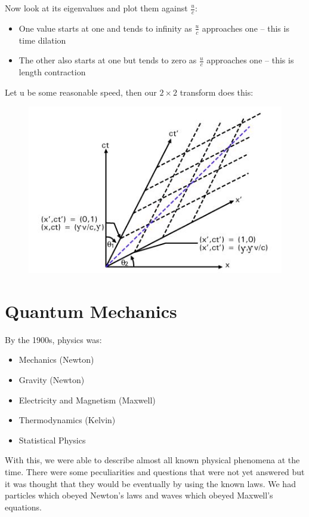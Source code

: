 \documentclass[a4paper, 11pt, normalem]{report}
\begin{document}
Now look at its eigenvalues and plot them against $\frac{u}{c}$: 
\begin{itemize}
    \item One value starts at one and tends to infinity as $\frac{u}{c}$ approaches one -- this is time dilation 
    \item The other also starts at one but tends to zero as $\frac{u}{c}$ approaches one -- this is length contraction 
\end{itemize}
Let u be some reasonable speed, then our $2\times2$ transform does this:
\begin{figure}[H]
    \centering
    \includegraphics{Lorentz.jpg}
\end{figure}

\chapter{Quantum Mechanics}
By the 1900s, physics was:
\begin{itemize}
    \item Mechanics (Newton)
    \item Gravity (Newton)
    \item Electricity and Magnetism (Maxwell)
    \item Thermodynamics (Kelvin)
    \item Statistical Physics
\end{itemize}
With this, we were able to describe almost all known physical phenomena at the time.
There were some peculiarities and questions that were not yet answered but it was thought that they would be eventually by using the known laws.
We had particles which obeyed Newton's laws and waves which obeyed Maxwell's equations.
\end{document}
